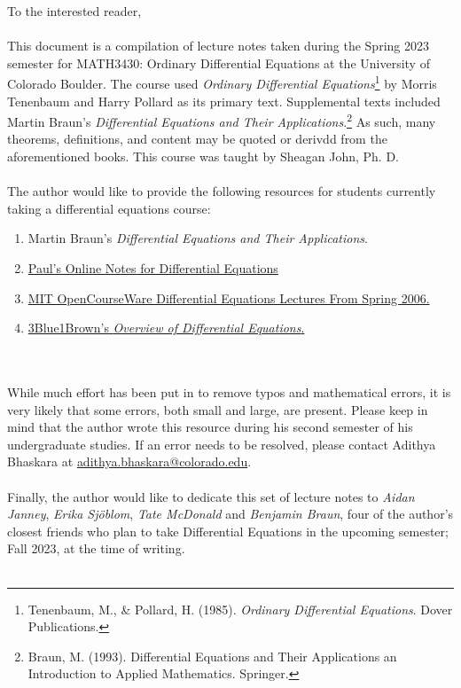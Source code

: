 To the interested reader,
\\
\\
This document is a compilation of lecture notes taken during the Spring 2023 semester for MATH3430: Ordinary Differential Equations at the University of Colorado Boulder. The course used \textit{Ordinary Differential Equations}\footnote{Tenenbaum, M., \& Pollard, H. (1985). \textit{Ordinary Differential Equations}. Dover Publications. } by Morris Tenenbaum and Harry Pollard as its primary text. Supplemental texts included Martin Braun's \textit{Differential Equations and Their Applications}.\footnote{Braun, M. (1993). Differential Equations and Their Applications an Introduction to Applied Mathematics. Springer.} As such, many theorems, definitions, and content may be quoted or derivdd from the aforementioned books. This course was taught by Sheagan John, Ph. D.
\\
\\
The author would like to provide the following resources for students currently taking a differential equations course:
\begin{enumerate}
    \item Martin Braun's \textit{Differential Equations and Their Applications}.
    \item \href{https://tutorial.math.lamar.edu/classes/de/de.aspx}{Paul's Online Notes for Differential Equations}
    \item \href{https://www.youtube.com/playlist?list=PLEC88901EBADDD980}{MIT OpenCourseWare Differential Equations Lectures From Spring 2006.}
    \item \href{https://www.youtube.com/playlist?list=PLZHQObOWTQDNPOjrT6KVlfJuKtYTftqH6}{3Blue1Brown's \textit{Overview of Differential Equations}.}
\end{enumerate}
\vphantom
\\
\\
While much effort has been put in to remove typos and mathematical errors, it is very likely that some errors, both small and large, are present. Please keep in mind that the author wrote this resource during his second semester of his undergraduate studies. If an error needs to be resolved, please contact Adithya Bhaskara at \href{mailto:adithya.bhaskara@colorado.edu}{adithya.bhaskara@colorado.edu}.
\\
\\
Finally, the author would like to dedicate this set of lecture notes to \textit{Aidan Janney}, \textit{Erika Sj\"{o}blom}, \textit{Tate McDonald} and \textit{Benjamin Braun}, four of the author's closest friends who plan to take Differential Equations in the upcoming semester; Fall 2023, at the time of writing.
\\
\\
\vfill
{}